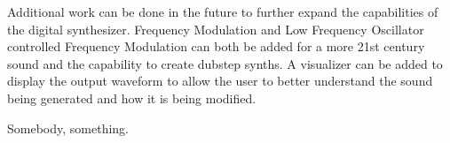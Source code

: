 \documentclass[a4paper,12pt]{report}
\begin{document}
Additional work can be done in the future to further expand the capabilities of the digital synthesizer. Frequency Modulation and Low Frequency Oscillator controlled Frequency Modulation can both be added for a more 21st century sound and the capability to create dubstep synths. A visualizer can be added to display the output waveform to allow the user to better understand the sound being generated and how it is being modified.

\begin{thebibliography}{9}
 Somebody, something.
\end{thebibliography}

\cleardoublepage
\listoffigures
\cleardoublepage
{}
\lstlistoflistings
\end{document}
